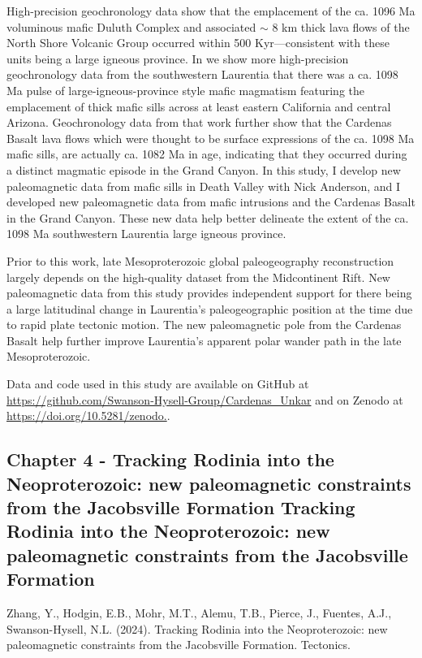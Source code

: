 \documentclass{ucbthesis}
\begin{document}
\begin{frontmatter}
\begin{preface}
High-precision geochronology data show that the emplacement of the ca. 1096 Ma voluminous mafic Duluth Complex and associated $\sim$ 8 km thick lava flows of the North Shore Volcanic Group occurred within 500 Kyr---consistent with these units being a large igneous province. In \cite{Mohr2024a} we show more high-precision geochronology data from the southwestern Laurentia that there was a ca. 1098 Ma pulse of large-igneous-province style mafic magmatism featuring the emplacement of thick mafic sills across at least eastern California and central Arizona. Geochronology data from that work further show that the Cardenas Basalt lava flows which were thought to be surface expressions of the ca. 1098 Ma mafic sills, are actually ca. 1082 Ma in age, indicating that they occurred during a distinct magmatic episode in the Grand Canyon. In this study, I develop new paleomagnetic data from mafic sills in Death Valley with Nick Anderson, and I developed new paleomagnetic data from mafic intrusions and the Cardenas Basalt in the Grand Canyon. These new data help better delineate the extent of the ca. 1098 Ma southwestern Laurentia large igneous province.

Prior to this work, late Mesoproterozoic global paleogeography reconstruction largely depends on the high-quality dataset from the Midcontinent Rift. New paleomagnetic data from this study provides independent support for there being a large latitudinal change in Laurentia's paleogeographic position at the time due to rapid plate tectonic motion. The new paleomagnetic pole from the Cardenas Basalt help further improve Laurentia's apparent polar wander path in the late Mesoproterozoic.

Data and code used in this study are available on GitHub at \url{https://github.com/Swanson-Hysell-Group/Cardenas_Unkar} and on Zenodo at \url{https://doi.org/10.5281/zenodo.}.

\clearpage 

\subsection{Chapter 4 - Tracking Rodinia into the Neoproterozoic: new paleomagnetic constraints from the Jacobsville Formation	Tracking Rodinia into the Neoproterozoic: new paleomagnetic constraints from the Jacobsville Formation}

Zhang, Y., Hodgin, E.B., Mohr, M.T., Alemu, T.B., Pierce, J., Fuentes, A.J., Swanson-Hysell, N.L. (2024). Tracking Rodinia into the Neoproterozoic: new paleomagnetic constraints from the Jacobsville Formation. Tectonics. 
\\


\end{preface}
\end{frontmatter}
\end{document}
